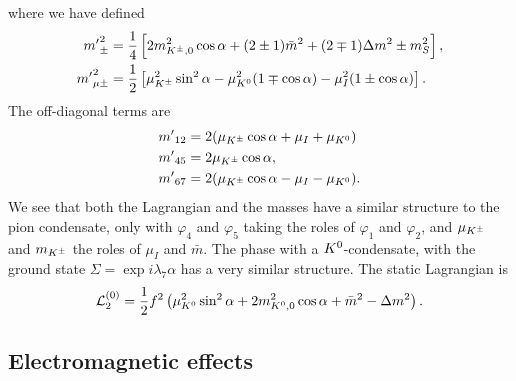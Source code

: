 \endgroup
%
where we have defined
%
\begingroup
\allowdisplaybreaks
\begin{align}
    {m'}_\pm^2
    & =
    \frac{1}{4}
    \left[
        2 m_{{K^\pm},0}^2\cos\alpha + (2\pm 1)\bar m^2 + (2\mp 1)\Delta m^2 \pm m_S^2
    \right], \\
    {m'}_{\mu\pm}^2
    & =
    \frac{1}{2}
    \left[
        \mu_{K^\pm}^2\sin^2\alpha
        -\mu^2_{{K^0}}(1\mp\cos\alpha)
        -\mu_I^2(1\pm\cos\alpha)
    \right].
\end{align}
\endgroup
%
The off-diagonal terms are
%
\begin{align}
    {m'}_{12} &= 2(\mu_{K^\pm} \cos\alpha + \mu_I + \mu_{K^0} )\\
    {m'}_{45} &= 2\mu_{K^\pm}\cos\alpha, \\
    {m'}_{67} &= 2(\mu_{K^\pm} \cos\alpha - \mu_I - \mu_{K^0}).
\end{align}
We see that both the Lagrangian and the masses have a similar structure to the pion condensate, only with $\varphi_4$ and $\varphi_5$ taking the roles of $\varphi_1$ and $\varphi_2$, and $\mu_{K^\pm}$ and $m_{K^\pm}$ the roles of $\mu_I$ and $\bar m$.
The phase with a ${K^0}$-condensate, with the ground state $\Sigma = \exp{i \lambda_7 \alpha}$ has a very similar structure.
The static Lagrangian is
%
\begin{equation}
    \label{static Lagrangian neutral kaon}
    \mathcal{L}_2^{(0)} = \frac{1}{2}f^2 
    \left(
        \mu_{K^0}^2 \sin^2\alpha
        + 2m_{{K^0},0}^2\cos\alpha + \bar m^2 - \Delta m^2
    \right).
\end{equation}



 

\subsection{Electromagnetic effects}

